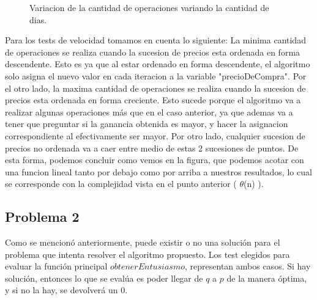 \documentclass[12pt, a4paper,english,spanish]{article}
\begin{document}
\begin{figure}[here]
\caption{Variacion de la cantidad de operaciones variando la cantidad de dias.}
\label{Variacion de la cantidad de operaciones variando la cantidad de dias.}
\end{figure}

 Para los tests de velocidad tomamos en cuenta lo siguiente: La minima cantidad de operaciones se realiza cuando la sucesion de precios esta ordenada en forma descendente. Esto es ya que al estar ordenado en forma descendente, el algoritmo solo asigna el nuevo valor en cada iteracion a la variable "precioDeCompra". Por el otro lado, la maxima cantidad de operaciones se realiza cuando la sucesion de precios esta ordenada en forma creciente. Esto sucede porque el algoritmo va a realizar algunas operaciones m\'as que en el caso anterior, ya que ademas va a tener que preguntar si la ganancia obtenida es mayor, y hacer la asignacion correspondiente al efectivamente ser mayor. Por otro lado, cualquier sucesion de precios no ordenada va a caer entre medio de estas 2 sucesiones de puntos. De esta forma, podemos concluir como vemos en la figura, que podemos acotar con una funcion lineal tanto por debajo como por arriba a nuestros resultados, lo cual se corresponde con la complejidad vista en el punto anterior (  $\theta$(n) ). 


\subsection*{Problema 2}

Como se mencion\'o anteriormente, puede existir o no una soluci\'on para el problema que intenta resolver el algoritmo propuesto. Los test elegidos para evaluar la funci\'on principal $obtenerEntusiasmo$, representan ambos casos. Si hay soluci\'on, entonces lo que se eval\'ua es poder llegar de $q$ a $p$ de la manera \'optima, y si no la hay, se devolver\'a un $0$. \\
\end{document}
